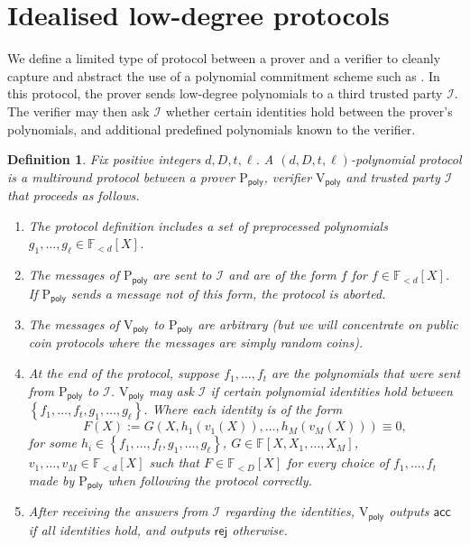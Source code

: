 \documentclass[11pt]{article} %
\newcommand{\F}{\ensuremath{\mathbb F}\xspace}
\newcommand{\rej}{\ensuremath{\mathsf{rej}}\xspace}
\newcommand{\acc}{\ensuremath{\mathsf{acc}}\xspace}
\newcommand{\defeq}{:=}
\newcommand{\prvpoly}{\ensuremath{\mathrm{P_{\mathsf{poly}}}}\xspace}
\newcommand{\verpoly}{\ensuremath{\mathrm{V_{\mathsf{poly}}}}\xspace}
\newcommand{\ideal}{\ensuremath{\mathcal{I}}\xspace}
\newcommand{\set}[1]{\ensuremath{\left\{#1\right\}}\xspace}
\newcommand{\polysofdeg}[1]{\ensuremath{\F_{< #1}[X]}\xspace}
\newtheorem{dfn}[lemma]{Definition}
\begin{document}
\section{Idealised low-degree protocols}\label{sec:polyprot}
We define a limited type of protocol between a prover and a verifier to cleanly capture and abstract the use of a polynomial commitment scheme such as \cite{kate}.
 In this protocol, the prover sends low-degree polynomials to a third trusted party \ideal.
The verifier may then ask \ideal whether certain identities hold between the prover's polynomials, and additional predefined polynomials known to the verifier.
\begin{dfn}\label{dfn:polyprotocol}
Fix positive integers $d,D,t,\ell$.
A \emph{$(d,D,t,\ell)$-polynomial protocol} is a multiround protocol between a prover \prvpoly, verifier 
\verpoly and trusted party \ideal that proceeds as follows.

\begin{enumerate}
\item The protocol definition includes a set of \emph{preprocessed polynomials} $g_1,\ldots,g_\ell \in \polysofdeg{d}$.

\item The messages of \prvpoly are sent to \ideal and are of the form $f$ for $f\in \polysofdeg{d}$. If \prvpoly sends a message not of this form, the protocol is aborted.
 
 
\item The messages of  \verpoly to \prvpoly are arbitrary (but we will concentrate on public coin protocols where the messages are simply random coins).


 \item At the end of the protocol, suppose $f_1,\ldots,f_t$ are the polynomials that were sent from \prvpoly to \ideal. \verpoly may ask \ideal if certain polynomial identities hold between \set{f_1,\ldots,f_t,g_1,\ldots,g_\ell}.
 Where each identity is of the form
 \[F(X)\defeq G(X, h_1(v_1(X)),\ldots,h_M(v_M(X)))\equiv 0,\]
 for some $h_i\in  \set{f_1,\ldots,f_t,g_1,\ldots,g_\ell}$, $G\in \F[X,X_1,\ldots,X_{M}]$, $v_1,\ldots,v_{M} \in \polysofdeg{d}$
 such that $F\in \polysofdeg{D}$ for every choice of $f_1,\ldots,f_t$ made by \prvpoly when following the protocol correctly.
 
 
 
 \item After receiving the answers from \ideal regarding the identities, \verpoly outputs \acc if all identities hold, and outputs \rej otherwise.

\end{enumerate}
 
\end{dfn}
\end{document}
